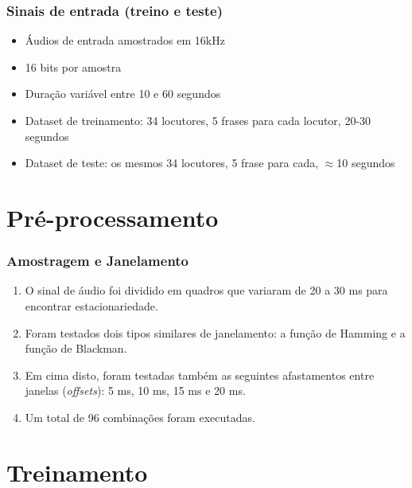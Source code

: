 \documentclass{beamer}
\begin{document}
\begin{frame} %
    \frametitle{Sinais de entrada (treino e teste)}

    \begin{itemize}
        \item Áudios de entrada amostrados em 16kHz 
        \medskip
        \item 16 bits por amostra
        \medskip
        \item Duração variável entre 10 e 60 segundos
        \medskip
        \item Dataset de treinamento: 34 locutores, 5 frases para cada locutor, 20-30 segundos
        \medskip
        \item Dataset de teste: os mesmos 34 locutores, 5 frase para cada, $\approx$10 segundos
    \end{itemize}
\end{frame}


\section{Pré-processamento}

\begin{frame} %
    \frametitle{Amostragem e Janelamento}

    \begin{enumerate}
        \item O sinal de áudio foi dividido em quadros que variaram de 20 a 30 ms para encontrar estacionariedade.
        \bigskip
        \item Foram testados dois tipos similares de janelamento: a função de Hamming e a função de Blackman.
        \bigskip
        \item Em cima disto, foram testadas também as seguintes afastamentos entre janelas (\emph{offsets}): 5 ms, 10 ms, 15 ms e 20 ms. 
        \bigskip
        \item Um total de 96 combinações foram executadas.
    \end{enumerate}
   

\end{frame}


\section{Treinamento}
\end{document}
